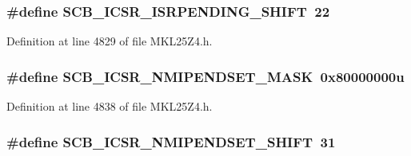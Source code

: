 \subsubsection[{\texorpdfstring{S\+C\+B\+\_\+\+I\+C\+S\+R\+\_\+\+I\+S\+R\+P\+E\+N\+D\+I\+N\+G\+\_\+\+S\+H\+I\+FT}{SCB_ICSR_ISRPENDING_SHIFT}}]{\setlength{\rightskip}{0pt plus 5cm}\#define S\+C\+B\+\_\+\+I\+C\+S\+R\+\_\+\+I\+S\+R\+P\+E\+N\+D\+I\+N\+G\+\_\+\+S\+H\+I\+FT~22}\hypertarget{group___s_c_b___register___masks_ga22f457e32a8d6a617ff90bdfb7b874de}{}\label{group___s_c_b___register___masks_ga22f457e32a8d6a617ff90bdfb7b874de}


Definition at line 4829 of file M\+K\+L25\+Z4.\+h.

\subsubsection[{\texorpdfstring{S\+C\+B\+\_\+\+I\+C\+S\+R\+\_\+\+N\+M\+I\+P\+E\+N\+D\+S\+E\+T\+\_\+\+M\+A\+SK}{SCB_ICSR_NMIPENDSET_MASK}}]{\setlength{\rightskip}{0pt plus 5cm}\#define S\+C\+B\+\_\+\+I\+C\+S\+R\+\_\+\+N\+M\+I\+P\+E\+N\+D\+S\+E\+T\+\_\+\+M\+A\+SK~0x80000000u}\hypertarget{group___s_c_b___register___masks_gab2a6cb5708895a81ec8826b8fa546145}{}\label{group___s_c_b___register___masks_gab2a6cb5708895a81ec8826b8fa546145}


Definition at line 4838 of file M\+K\+L25\+Z4.\+h.

\subsubsection[{\texorpdfstring{S\+C\+B\+\_\+\+I\+C\+S\+R\+\_\+\+N\+M\+I\+P\+E\+N\+D\+S\+E\+T\+\_\+\+S\+H\+I\+FT}{SCB_ICSR_NMIPENDSET_SHIFT}}]{\setlength{\rightskip}{0pt plus 5cm}\#define S\+C\+B\+\_\+\+I\+C\+S\+R\+\_\+\+N\+M\+I\+P\+E\+N\+D\+S\+E\+T\+\_\+\+S\+H\+I\+FT~31}\hypertarget{group___s_c_b___register___masks_ga8a185fc794df7e755e5f3a8b3a06d042}{}\label{group___s_c_b___register___masks_ga8a185fc794df7e755e5f3a8b3a06d042}


